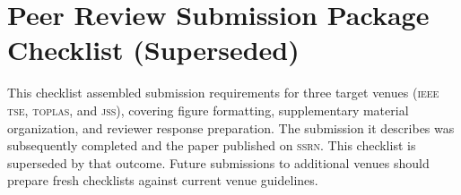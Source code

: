 
\section*{Peer Review Submission Package Checklist (Superseded)}

This checklist assembled submission requirements for three target venues
(\textsc{ieee tse}, \textsc{toplas}, and \textsc{jss}), covering figure
formatting, supplementary material organization, and reviewer response
preparation. The submission it describes was subsequently completed and
the paper published on \textsc{ssrn}. This checklist is superseded by
that outcome. Future submissions to additional venues should prepare
fresh checklists against current venue guidelines.
